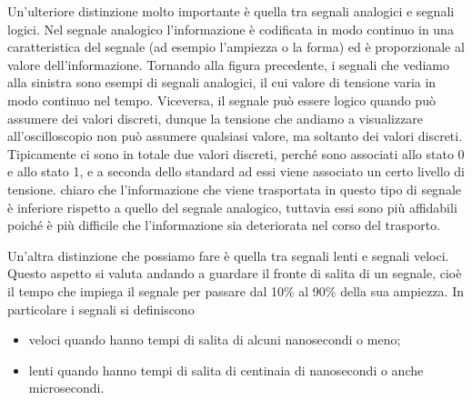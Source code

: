 \vspace{0.2cm}Un'ulteriore distinzione molto importante è quella tra segnali analogici e segnali logici. Nel segnale analogico l'informazione è codificata in modo continuo in una caratteristica del segnale (ad esempio l'ampiezza o la forma) ed è proporzionale al valore dell'informazione. Tornando alla figura precedente, i segnali che vediamo alla sinistra sono esempi di segnali analogici, il cui valore di tensione varia in modo continuo nel tempo. Viceversa, il segnale può essere logico quando può assumere dei valori discreti, dunque la tensione che andiamo a visualizzare all'oscilloscopio non può assumere qualsiasi valore, ma soltanto dei valori discreti. Tipicamente ci sono in totale due valori discreti, perché sono associati allo stato 0 e allo stato 1, e a seconda dello standard ad essi viene associato un certo livello di tensione. \E chiaro che l'informazione che viene trasportata in questo tipo di segnale è inferiore rispetto a quello del segnale analogico, tuttavia essi sono più affidabili poiché è più difficile che l'informazione sia deteriorata nel corso del
trasporto.

Un'altra distinzione che possiamo fare è quella tra segnali lenti e segnali veloci. Questo aspetto si valuta andando a guardare il fronte di salita di un segnale, cioè il tempo che impiega il segnale per passare dal 10\% al 90\% della sua ampiezza. In particolare i segnali si definiscono
\begin{itemize}
   \item veloci quando hanno tempi di salita di alcuni nanosecondi o meno;
   \item lenti quando hanno tempi di salita di centinaia di nanosecondi o anche microsecondi.
\end{itemize}


